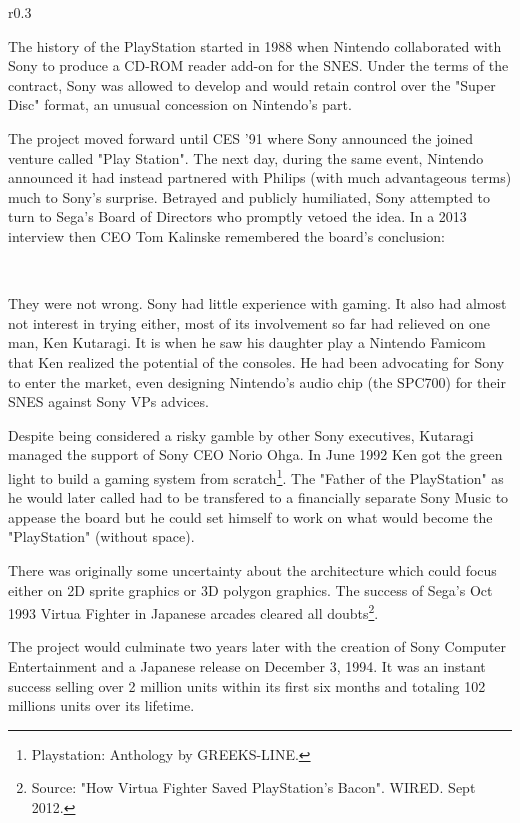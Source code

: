 \begin{wrapfigure}[11]{r}{0.3\textwidth}{
\centering {}}
\end{wrapfigure}
The history of the PlayStation started in 1988 when Nintendo collaborated with Sony to produce a CD-ROM reader add-on for the SNES. Under the terms of the contract, Sony was allowed to develop and would retain control over the "Super Disc" format, an unusual concession on Nintendo's part.\\
\par
 The project moved forward until CES '91 where Sony announced the joined venture called "Play Station". The next day, during the same event, Nintendo announced it had instead partnered with Philips (with much advantageous terms) much to Sony's surprise. Betrayed and publicly humiliated, Sony attempted to turn to Sega's Board of Directors who promptly vetoed the idea. In a 2013 interview then CEO Tom Kalinske remembered the board's conclusion:\\
\par
{}\\
\par
They were not wrong. Sony had little experience with gaming. It also had almost not interest in trying either, most of its involvement so far had relieved on one man, Ken Kutaragi. It is when he saw his daughter play a Nintendo Famicom that Ken realized the potential of the consoles. He had been advocating for Sony to enter the market, even designing Nintendo's audio chip (the SPC700) for their SNES against Sony VPs advices.\\
\par
 Despite being considered a risky gamble by other Sony executives, Kutaragi managed the support of Sony CEO Norio Ohga. In June 1992 Ken got the green light to build a gaming system from scratch\footnote{Playstation: Anthology by GREEKS-LINE.}. The "Father of the PlayStation" as he would later called had to be transfered to a financially separate Sony Music to appease the board but he could set himself to work on what would become the "PlayStation" (without space).\\
\par
There was originally some uncertainty about the architecture which could focus either on 2D sprite graphics or 3D polygon graphics. The success of Sega's Oct 1993 Virtua Fighter in Japanese arcades cleared all doubts\footnote{Source: "How Virtua Fighter Saved PlayStation's Bacon". WIRED. Sept 2012.}.\\
\par
The project would culminate two years later with the creation of Sony Computer Entertainment and a Japanese release on December 3, 1994. It was an instant success selling over 2 million units within its first six months and totaling 102 millions units over its lifetime.\\
\par
{}


